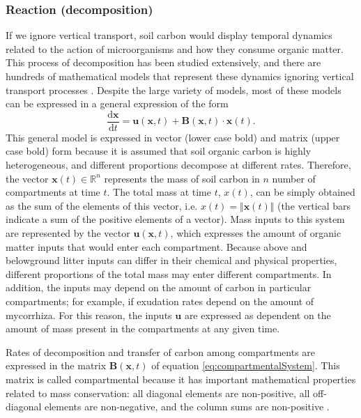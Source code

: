 \documentclass[11pt, oneside, a4paper]{article}   	%
\providecommand{\DIFaddtex}[1]{{\protect\color{blue}\uwave{#1}}} %
\providecommand{\DIFaddbegin}{} %
\providecommand{\DIFaddend}{} %
\providecommand{\DIFadd}[1]{\texorpdfstring{\DIFaddtex{#1}}{#1}} %
\newcommand{\DIFaddincludegraphics}[2][]{{\color{blue}\fbox{\DIFOincludegraphics[#1]{#2}}}} %
\DeclareRobustCommand{\DIFaddbegin}{\DIFOaddbegin \let\includegraphics\DIFaddincludegraphics} %
\DeclareRobustCommand{\DIFaddend}{\DIFOaddend \let\includegraphics\DIFOincludegraphics} %
\begin{document}
\subsubsection{Reaction (decomposition)}
If we ignore vertical transport, soil carbon would display temporal dynamics related to the action of microorganisms and how they consume organic matter. This process of decomposition has been studied extensively, and there are hundreds of mathematical models that represent these dynamics ignoring vertical transport processes \citep{Manzoni2009}. Despite the large variety of models, most of these models can be expressed in a general expression of the form \citep{Sierra2015EM, Sierra2018JAMES}
\begin{equation} \label{eq:compartmentalSystem}
\frac{\mathrm{d} \bm{x}}{\mathrm{d}t} = \bm{u}(\bm{x}, t) + \mathbf{B}(\bm{x}, t) \cdot \bm{x}(t) .
\end{equation}
This general model is expressed in vector (lower case bold) and matrix (upper case bold) form because it is assumed that soil organic carbon is highly heterogeneous, and different proportions  decompose at different rates. Therefore, the vector $\bm{x}(t) \in \mathbb{R}^n$ represents the mass of soil carbon in $n$ number of compartments at time $t$. The total mass at time $t$, $x(t)$, can be simply obtained as the sum of the elements of this vector, i.e. $x(t) = \Vert \bm{x}(t) \Vert$ (the vertical bars \DIFaddbegin \DIFadd{represent a norm and }\DIFaddend indicate a sum of the positive elements of a vector). Mass inputs to this system are represented by the vector $\bm{u}(\bm{x}, t)$, which expresses the amount of organic matter inputs that would enter each compartment. Because above and belowground litter inputs can differ in their chemical and physical properties, different proportions of the total mass may enter different compartments. In addition, the inputs may depend on the amount of carbon in particular compartments; for example, if exudation rates depend on the amount of mycorrhiza. For this reason, the inputs $\bm{u}$ are expressed as dependent on the amount of mass present in the compartments at any given time. 

Rates of decomposition and transfer of carbon among compartments are expressed in the matrix $\mathbf{B}(\bm{x}, t)$ of equation \ref{eq:compartmentalSystem}. This matrix is called compartmental because it has important mathematical properties related to mass conservation: all diagonal elements are non-positive, all off-diagonal elements are non-negative, and the column sums are non-positive \citep{Metzler2018MG, Sierra2018JAMES}.
\end{document}
